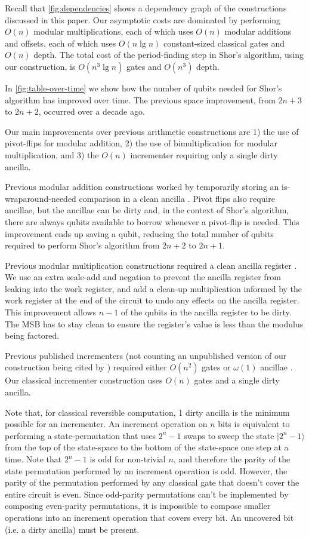 \documentclass[twocolumn,longbibliography]{quantumarticle-customized}
\begin{document}
Recall that \autoref{fig:dependencies} shows a dependency graph of the constructions discussed in this paper.
Our asymptotic costs are dominated by performing $O(n)$ modular multiplications, each of which uses $O(n)$ modular additions and offsets, each of which uses $O(n \lg n)$ constant-sized classical gates \cite{haner2016} and $O(n)$ depth.
The total cost of the period-finding step in Shor's algorithm, using our construction, is $O(n^3 \lg n)$ gates and $O(n^3)$ depth.

In \autoref{fig:table-over-time} we show how the number of qubits needed for Shor's algorithm has improved over time.
The previous space improvement, from $2n+3$ to $2n+2$, occurred over a decade ago.

Our main improvements over previous arithmetic constructions are 1) the use of pivot-flips for modular addition, 2) the use of bimultiplication for modular multiplication, and 3) the $O(n)$ incrementer requiring only a single dirty ancilla.

Previous modular addition constructions worked by temporarily storing an is-wraparound-needed comparison in a clean ancilla \cite{takahashi2006, haner2016}.
Pivot flips also require ancillae, but the ancillae can be dirty and, in the context of Shor's algorithm, there are always qubits available to borrow whenever a pivot-flip is needed.
This improvement ends up saving a qubit, reducing the total number of qubits required to perform Shor's algorithm from $2n+2$ to $2n+1$.

Previous modular multiplication constructions required a clean ancilla register \cite{haner2016}.
We use an extra scale-add and negation to prevent the ancilla register from leaking into the work register, and add a clean-up multiplication informed by the work register at the end of the circuit to undo any effects on the ancilla register.
This improvement allows $n-1$ of the qubits in the ancilla register to be dirty.
The MSB has to stay clean to ensure the register's value is less than the modulus being factored.

Previous published incrementers (not counting an unpublished version of our construction being cited by \cite{haner2016}) required either $O(n^2)$ gates or $\omega(1)$ ancillae \cite{draper2000, barenco1995}.
Our classical incrementer construction uses $O(n)$ gates and a single dirty ancilla.

Note that, for classical reversible computation, 1 dirty ancilla is the minimum possible for an incrementer.
An increment operation on $n$ bits is equivalent to performing a state-permutation that uses $2^n-1$ swaps to sweep the state $|2^n-1\rangle$ from the top of the state-space to the bottom of the state-space one step at a time.
Note that $2^n-1$ is odd for non-trivial $n$, and therefore the parity of the state permutation performed by an increment operation is odd.
However, the parity of the permutation performed by any classical gate that doesn't cover the entire circuit is even.
Since odd-parity permutations can't be implemented by composing even-parity permutations, it is impossible to compose smaller operations into an increment operation that covers every bit.
An uncovered bit (i.e. a dirty ancilla) must be present.
\end{document}
